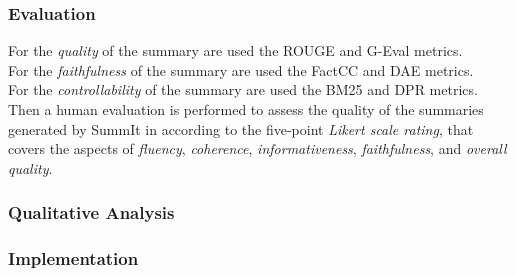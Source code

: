 \documentclass[12pt]{article}
\begin{document}
\subsubsection{Evaluation}
\label{subsubsec:SummIt_evaluation}

For the \emph{quality} of the summary are used the ROUGE and G-Eval metrics. \\
For the \emph{faithfulness} of the summary are used the FactCC and DAE metrics. \\ 
For the \emph{controllability} of the summary are used the BM25 and DPR metrics. \\
Then a human evaluation is performed to assess the quality of the summaries generated by SummIt in according to the five-point \emph{Likert scale rating}, that covers the aspects of \emph{fluency}, \emph{coherence}, \emph{informativeness}, \emph{faithfulness}, and \emph{overall quality}.

\subsubsection{Qualitative Analysis}
\label{subsubsec:SummIt_qualitative_analysis}



\subsubsection{Implementation}
\label{subsubsec:SummIt_implementation}
\end{document}
